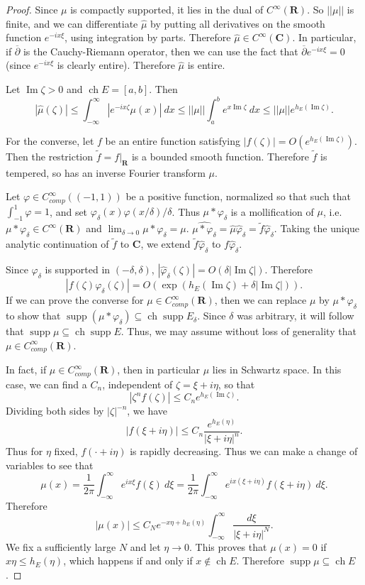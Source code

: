 \documentclass[12pt]{report}
\newcommand{\RR}{\mathbf{R}}
\newcommand{\CC}{\mathbf{C}}
\DeclareMathOperator{\ch}{ch}
\DeclareMathOperator{\supp}{supp}
\newcommand{\dbar}{\overline \partial}
\renewcommand{\Im}{\operatorname{Im}}
\theoremstyle{definition}
\begin{document}
\begin{proof}
    Since $\mu$ is compactly supported, it lies in the dual of $C^\infty(\RR)$. So $||\mu||$ is finite, and we can differentiate $\hat \mu$ by putting all derivatives on the smooth function $e^{-ix\xi}$, using integration by parts. Therefore $\hat \mu \in C^\infty(\CC)$. In particular, if $\dbar$ is the Cauchy-Riemann operator, then we can use the fact that $\dbar e^{-ix\xi} = 0$ (since $e^{-i x\xi}$ is clearly entire). Therefore $\hat \mu$ is entire.

    Let $\Im \zeta > 0$ and $\ch E = [a, b]$. Then
$$|\hat \mu(\zeta)| \leq \int_{-\infty}^\infty |e^{-ix\zeta} \mu(x)| ~dx \leq ||\mu|| \int_a^b e^{x \Im \zeta} ~dx \leq ||\mu|| e^{h_E(\Im \zeta)}.$$

    For the converse, let $f$ be an entire function satisfying $|f(\zeta)| = O(e^{h_E(\Im \zeta)})$. Then the restriction $\tilde f = f|_\RR$ is a bounded smooth function. Therefore $\tilde f$ is tempered, so has an inverse Fourier transform $\mu$.

    Let $\varphi \in C^\infty_{comp}((-1, 1))$ be a positive function, normalized so that such that $\int_{-1}^1 \varphi = 1$, and set $\varphi_\delta(x) \varphi(x/\delta)/\delta$. Thus $\mu * \varphi_\delta$ is a mollification of $\mu$, i.e. $\mu * \varphi_\delta \in C^\infty(\RR)$ and $\lim_{\delta \to 0} \mu * \varphi_\delta = \mu$. $\widehat{\mu*\varphi_\delta} = \hat \mu  \hat \varphi_\delta = \tilde f \hat \varphi_\delta$. Taking the unique analytic continuation of $\tilde f$ to $\CC$, we extend $\tilde f \hat \varphi_\delta$ to $f \hat \varphi_\delta$.

    Since $\varphi_\delta$ is supported in $(-\delta, \delta)$, $|\hat \varphi_\delta(\zeta)| = O(\delta |\Im \zeta|)$. Therefore
$$|f(\zeta) \varphi_\delta(\zeta)| = O(\exp(h_E(\Im \zeta) + \delta|\Im \zeta|)).$$
    If we can prove the converse for $\mu \in C^\infty_{comp}(\RR)$, then we can replace $\mu$ by $\mu * \varphi_\delta$ to show that $\supp (\mu * \varphi_\delta) \subseteq \ch \supp E_\delta$. Since $\delta$ was arbitrary, it will follow that $\supp \mu \subseteq \ch \supp E$. Thus, we may assume without loss of generality that $\mu \in C^\infty_{comp}(\RR)$.

    In fact, if $\mu \in C^\infty_{comp}(\RR)$, then in particular $\mu$ lies in Schwartz space. In this case, we can find a $C_n$, independent of $\zeta = \xi + i\eta$, so that
$$|\zeta^n f(\zeta)| \leq C_n e^{h_E(\Im \zeta)}.$$
    Dividing both sides by $|\zeta|^{-n}$, we have
    $$|f(\xi + i \eta)| \leq C_n \frac{e^{h_E(\eta)}}{|\xi + i\eta|^n}.$$
    Thus for $\eta$ fixed, $f(\cdot + i\eta)$ is rapidly decreasing. Thus we can make a change of variables to see that
$$\mu(x) = \frac{1}{2\pi} \int_{-\infty}^\infty e^{ix\xi} f(\xi) ~d\xi = \frac{1}{2\pi} \int_{-\infty}^\infty e^{ix(\xi+i\eta)} f(\xi + i\eta) ~d\xi.$$
    Therefore
    $$|\mu(x)| \leq C_Ne^{-x\eta + h_E(\eta)} \int_{-\infty}^\infty \frac{d\xi}{|\xi + i\eta|^N}.$$
    We fix a sufficiently large $N$ and let $\eta \to 0$. This proves that $\mu(x) = 0$ if $x\eta \leq h_E(\eta)$, which happens if and only if $x \notin \ch E$. Therefore $\supp \mu \subseteq \ch E$.
\end{proof}
\end{document}
